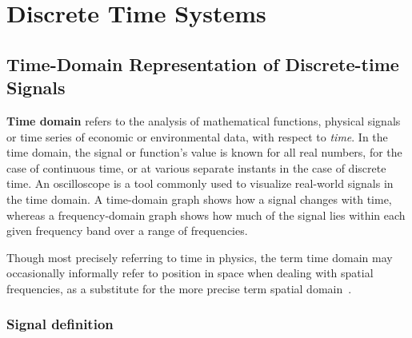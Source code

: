 \documentclass[\documentfontsize, twocolumn]{\classname}
\begin{document}
\setmonofont[Scale=0.9]{IBM Plex Mono}

\setstretch{\spacingvalue}
\setlength{\emergencystretch}{0pt}
\hfuzz=0pt
\setlength{\headsep}{\headsepvalue}
\setlength{\footskip}{\footskipvalue}
\setlength{\marginparsep}{\marginparsepvalue}
\setlength{\marginparwidth}{\marginparwidthvalue}

\tableofcontents

%

\part{Discrete Time Systems}

\chapter{Time-Domain Representation of Discrete-time Signals}

\textbf{Time domain} refers to the analysis of mathematical functions, physical
signals or time series of economic or environmental data, with respect to
\emph{time}. In the time domain, the signal or function's value is known for
all real numbers, for the case of continuous time, or at various separate
instants in the case of discrete time. An oscilloscope is a tool commonly used
to visualize real-world signals in the time domain. A time-domain graph shows
how a signal changes with time, whereas a fre\-quen\-cy-do\-ma\-in graph shows
how much of the signal lies within each given frequency band over a range of
frequencies.

Though most precisely referring to time in physics, the term time domain may
occasionally informally refer to position in space when dealing with spatial
frequencies, as a substitute for the more precise term spatial domain~\cite{bib:wikiTimeDomain}.

\section{Signal definition}
\end{document}

